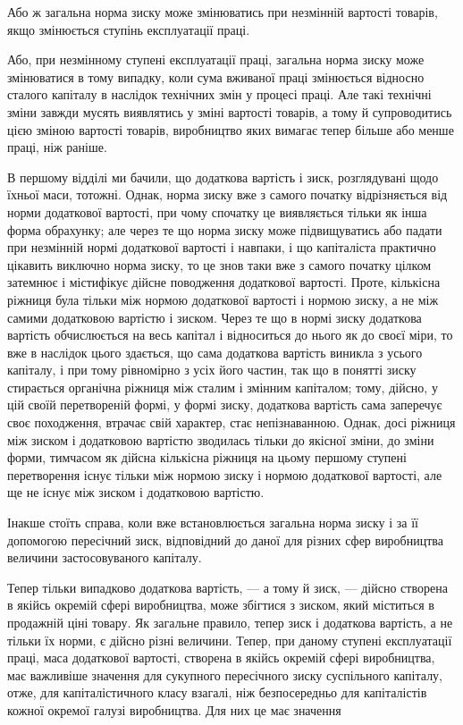 
Або ж загальна норма зиску може змінюватись при незмінній вартості товарів, якщо змінюється ступінь
експлуатації праці.

Або, при незмінному ступені експлуатації праці, загальна
норма зиску може змінюватися в тому випадку, коли сума вживаної праці змінюється відносно сталого
капіталу в наслідок
технічних змін у процесі праці. Але такі технічні зміни завжди
мусять виявлятись у зміні вартості товарів, а тому й супроводитись цією зміною вартості товарів,
виробництво яких вимагає
тепер більше або менше праці, ніж раніше.

В першому відділі ми бачили, що додаткова вартість і зиск,
розглядувані щодо їхньої маси, тотожні. Однак, норма зиску вже
з самого початку відрізняється від норми додаткової вартості,
при чому спочатку це виявляється тільки як інша форма обрахунку; але через те що норма зиску може
підвищуватись або
падати при незмінній нормі додаткової вартості і навпаки, і що
капіталіста практично цікавить виключно норма зиску, то це
знов таки вже з самого початку цілком затемнює і містифікує
дійсне поводження додаткової вартості. Проте, кількісна ріжниця
була тільки між нормою додаткової вартості і нормою зиску,
а не між самими додатковою вартістю і зиском. Через те що
в нормі зиску додаткова вартість обчислюється на весь капітал
і відноситься до нього як до своєї міри, то вже в наслідок
цього здається, що сама додаткова вартість виникла з усього
капіталу, і при тому рівномірно з усіх його частин, так що
в понятті зиску стирається органічна ріжниця між сталим і змінним капіталом; тому, дійсно, у цій
своїй перетвореній формі,
у формі зиску, додаткова вартість сама заперечує своє походження, втрачає свій характер, стає
непізнаванною. Однак, досі
ріжниця між зиском і додатковою вартістю зводилась тільки до
якісної зміни, до зміни форми, тимчасом як дійсна кількісна
ріжниця на цьому першому ступені перетворення існує тільки
між нормою зиску і нормою додаткової вартості, але ще не існує
між зиском і додатковою вартістю.

Інакше стоїть справа, коли вже встановлюється загальна
норма зиску і за її допомогою пересічний зиск, відповідний до
даної для різних сфер виробництва величини застосовуваного
капіталу.

Тепер тільки випадково додаткова вартість, — а тому й зиск, — дійсно створена в якійсь окремій сфері
виробництва, може збігтися з зиском, який міститься в продажній ціні товару. Як загальне правило,
тепер зиск і додаткова вартість, а не тільки їх
норми, є дійсно різні величини. Тепер, при даному ступені
експлуатації праці, маса додаткової вартості, створена в якійсь
окремій сфері виробництва, має важливіше значення для сукупного пересічного зиску суспільного
капіталу, отже, для капіталістичного класу взагалі, ніж безпосередньо для капіталістів кожної
окремої галузі виробництва. Для них це має значення
\parbreak{}  %
